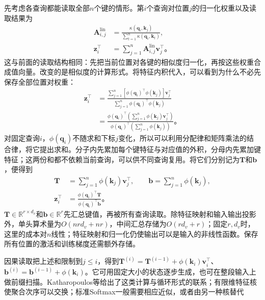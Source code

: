 先考虑各查询都能读取全部$n$个键的情形。第$i$个查询对位置$j$的归一化权重以及读取结果为
\[
  \begin{aligned}
    \bm A^{\mathrm{lin}}_{i,j}
      &=\frac{\kappa(\bm q_i,\bm k_j)}
                   {\sum_{t=1}^n\kappa(\bm q_i,\bm k_t)},\\
    \bm z_i^{\top}
      &=\sum_{j=1}^n\bm A^{\mathrm{lin}}_{i,j}\bm v_j^{\top}\text{。}
  \end{aligned}
\]
这与前面的读取结构相同：先把当前位置对各键的相似度归一化，再按这些权重合成值向量。改变的是相似度的计算形式。将特征内积代入，可以看到为什么不必先保存全部位置对权重：
\[
  \begin{aligned}
    \bm z_i^{\top}
      &=\frac{\sum_{j=1}^n
                  [\phi(\bm q_i)^{\top}\phi(\bm k_j)]\bm v_j^{\top}}
                   {\sum_{j=1}^n\phi(\bm q_i)^{\top}\phi(\bm k_j)}\\
      &=\frac{\phi(\bm q_i)^{\top}
                     \left(\sum_{j=1}^n\phi(\bm k_j)\bm v_j^{\top}\right)}
                   {\phi(\bm q_i)^{\top}
                     \left(\sum_{j=1}^n\phi(\bm k_j)\right)}\text{。}
  \end{aligned}
\]
对固定查询$i$，$\phi(\bm q_i)$不随求和下标$j$变化，所以可以利用分配律和矩阵乘法的结合律，将它提出求和。分子内先累加每个键特征与对应值的外积，分母内先累加键特征；这两份和都不依赖当前查询，可以供不同查询复用。将它们分别记为$\bm T$和$\bm b$，便得到
\begin{equation}
  \begin{aligned}
    \bm T&=\sum_{j=1}^n\phi(\bm k_j)\bm v_j^{\top},\qquad
    \bm b=\sum_{j=1}^n\phi(\bm k_j),\\
    \bm z_i^{\top}&=\frac{\phi(\bm q_i)^{\top}\bm T}
                           {\phi(\bm q_i)^{\top}\bm b}\text{。}
  \end{aligned}
  \label{eq:transformer-linear-attention}
\end{equation}
$\bm T\in\mathbb R^{r\times d_v}$和$\bm b\in\mathbb R^r$先汇总键值，再被所有查询读取。除特征映射和输入输出投影外，单头算术量为$O(nrd_v+nr)$，中间汇总存储为$O(rd_v+r)$；固定$r,d_v$时，这里的成本对$n$线性；特征映射和归一化仍使输出可以是输入的非线性函数。保存所有位置的激活和训练梯度还需额外存储。

因果读取把上述和限制到$j\leq i$，得到$\bm T^{(i)}=\bm T^{(i-1)}+\phi(\bm k_i)\bm v_i^{\top}$、$\bm b^{(i)}=\bm b^{(i-1)}+\phi(\bm k_i)$。它可用固定大小的状态逐步生成，也可在整段输入上做前缀扫描。Katharopoulos等给出了这类计算与循环形式的联系；有限维特征核使聚合次序可以交换；标准Softmax一般需要相应近似，或者由另一种核替代

